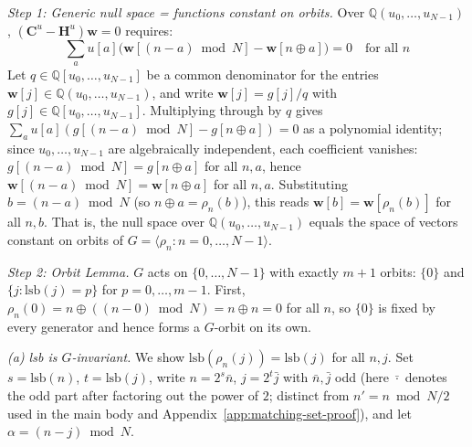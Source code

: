 \documentclass[11pt]{article}
\begin{document}
\medskip
\noindent\textit{Step 1: Generic null space = functions constant on orbits.} Over $\mathbb{Q}(u_0,\ldots,u_{N-1})$, $(\mathbf{C}^u - \mathbf{H}^u)\mathbf{w} = 0$ requires:
\[
\sum_a u[a]\bigl(\mathbf{w}[(n-a)\bmod N] - \mathbf{w}[n\oplus a]\bigr) = 0 \quad\text{for all }n
\]
Let $q \in \mathbb{Q}[u_0,\ldots,u_{N-1}]$ be a common denominator for the entries $\mathbf{w}[j] \in \mathbb{Q}(u_0,\ldots,u_{N-1})$, and write $\mathbf{w}[j] = g[j]/q$ with $g[j] \in \mathbb{Q}[u_0,\ldots,u_{N-1}]$. Multiplying through by $q$ gives $\sum_a u[a](g[(n-a)\bmod N] - g[n\oplus a]) = 0$ as a polynomial identity; since $u_0,\ldots,u_{N-1}$ are algebraically independent, each coefficient vanishes: $g[(n-a)\bmod N] = g[n\oplus a]$ for all $n,a$, hence $\mathbf{w}[(n-a)\bmod N] = \mathbf{w}[n\oplus a]$ for all $n,a$. Substituting $b = (n-a)\bmod N$ (so $n\oplus a = \rho_n(b)$), this reads $\mathbf{w}[b] = \mathbf{w}[\rho_n(b)]$ for all $n,b$. That is, the null space over $\mathbb{Q}(u_0,\ldots,u_{N-1})$ equals the space of vectors constant on orbits of $G = \langle\rho_n : n = 0,\ldots,N-1\rangle$.

\medskip
\noindent\textit{Step 2: Orbit Lemma.} $G$ acts on $\{0,\ldots,N-1\}$ with exactly $m+1$ orbits: $\{0\}$ and $\{j : \mathrm{lsb}(j) = p\}$ for $p = 0,\ldots,m-1$. First, $\rho_n(0) = n \oplus ((n-0)\bmod N) = n \oplus n = 0$ for all $n$, so $\{0\}$ is fixed by every generator and hence forms a $G$-orbit on its own.

\smallskip
\emph{(a) lsb is $G$-invariant.} We show $\mathrm{lsb}(\rho_n(j)) = \mathrm{lsb}(j)$ for all $n,j$. Set $s = \mathrm{lsb}(n)$, $t = \mathrm{lsb}(j)$, write $n = 2^s \bar{n}$, $j = 2^t \bar{j}$ with $\bar{n},\bar{j}$ odd (here $\bar{\cdot}$ denotes the odd part after factoring out the power of $2$; distinct from $n' = n\bmod N/2$ used in the main body and Appendix~\ref{app:matching-set-proof}), and let $\alpha = (n-j)\bmod N$.
\end{document}
